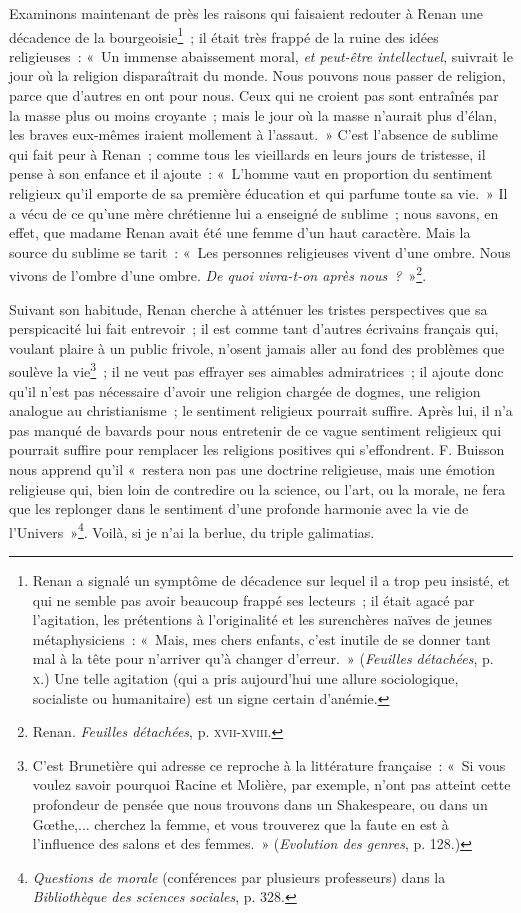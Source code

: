 \documentclass[french,twoside]{book} %
\begin{document}
\noindent Examinons maintenant de près les raisons qui faisaient redouter à Renan une décadence de la bourgeoisie\footnote{ \noindent Renan a signalé un symptôme de décadence sur lequel il a trop peu insisté, et qui ne semble pas avoir beaucoup frappé ses lecteurs ; il était agacé par l’agitation, les prétentions à l’originalité et les surenchères naïves de jeunes métaphysiciens : « Mais, mes chers enfants, c’est inutile de se donner tant mal à la tête pour n’arriver qu’à changer d’erreur. » (\emph{Feuilles détachées}, p. {\scshape x}.) Une telle agitation (qui a pris aujourd’hui une allure sociologique, socialiste ou humanitaire) est un signe certain d’anémie.
 } ;  il était très frappé de la ruine des idées religieuses : « Un immense abaissement moral, \emph{et peut-être intellectuel}, suivrait le jour où la religion disparaîtrait du monde. Nous pouvons nous passer de religion, parce que d’autres en ont pour nous. Ceux qui ne croient pas sont entraînés par la masse plus ou moins croyante ; mais le jour où la masse n’aurait plus d’élan, les braves eux-mêmes iraient mollement à l’assaut. » C’est l’absence de sublime qui fait peur à Renan ; comme tous les vieillards en leurs jours de tristesse, il pense à son enfance et il ajoute : « L’homme vaut en proportion du sentiment religieux qu’il emporte de sa première éducation et qui parfume toute sa vie. » Il a vécu de ce qu’une mère chrétienne lui a enseigné de sublime ; nous savons, en effet, que madame Renan avait été une femme d’un haut caractère. Mais la source du sublime se tarit : « Les personnes religieuses vivent d’une ombre. Nous vivons de l’ombre d’une ombre. \emph{De quoi vivra-t-on après nous ?} »\footnote{ \noindent Renan. \emph{Feuilles détachées}, p. {\scshape xvii-xviii}.
 }.\par
Suivant son habitude, Renan cherche à atténuer les tristes perspectives que sa perspicacité lui fait entrevoir ; il est comme tant d’autres écrivains français qui, voulant plaire à un public frivole, n’osent jamais aller au fond des problèmes que soulève la vie\footnote{ \noindent C’est Brunetière qui adresse ce reproche à la littérature française : « Si vous voulez savoir pourquoi Racine et Molière, par exemple, n’ont pas atteint cette profondeur de pensée que nous trouvons dans un Shakespeare, ou dans un Gœthe,... cherchez la femme, et vous trouverez que la faute en est à l’influence des salons et des femmes. » (\emph{Evolution des genres}, p. 128.)
 } ; il ne veut pas  effrayer ses aimables admiratrices ; il ajoute donc qu’il n’est pas nécessaire d’avoir une religion chargée de dogmes, une religion analogue au christianisme ; le sentiment religieux pourrait suffire. Après lui, il n’a pas manqué de bavards pour nous entretenir de ce vague sentiment religieux qui pourrait suffire pour remplacer les religions positives qui s’effondrent. F. Buisson nous apprend qu’il « restera non pas une doctrine religieuse, mais une émotion religieuse qui, bien loin de contredire ou la science, ou l’art, ou la morale, ne fera que les replonger dans le sentiment d’une profonde harmonie avec la vie de l’Univers »\footnote{ \noindent \emph{Questions de morale} (conférences par plusieurs professeurs) dans la \emph{Bibliothèque des sciences sociales}, p. 328.
 }. Voilà, si je n’ai la berlue, du triple galimatias.\par
\end{document}
